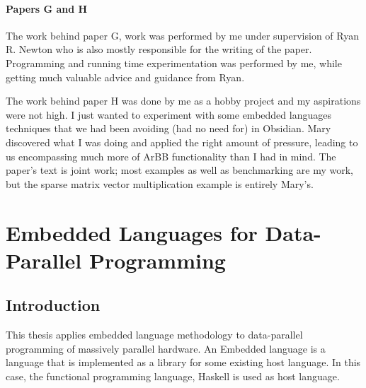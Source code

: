 \documentclass[a4paper]{book}
\newcommand{\thesistitle}{Embedded Languages for Data-Parallel Programming}
\begin{document}
\subsubsection{Papers G and H} 
The work behind paper G, work was performed by me 
under supervision of Ryan R. Newton who is also mostly responsible for the writing of the 
paper. Programming and running time experimentation was performed by me, while getting much 
valuable advice and guidance from Ryan. 

The work behind paper H was done by me as a hobby project and my aspirations were not 
high. I just wanted to experiment with some embedded languages techniques that we had 
been avoiding (had no need for) in Obsidian. Mary discovered what I was doing and applied 
the right amount of pressure, leading to us encompassing much more of ArBB functionality than 
I had in mind. The paper's text is joint work; most examples as well as benchmarking are my work,
but the sparse matrix vector multiplication example is entirely Mary's. 



\tableofcontents


\cleardoublepage
\clearpage

\pagestyle{fancy}
\fancyfoot{}
\fancyhead[LO]{}
\fancyhead[RO]{\leftmark}
\renewcommand{\headrulewidth}{0.0pt}
\fancyhead[LE,RO]{\thepage}

%
%
\chapter{\thesistitle}

\section{Introduction} 

This thesis applies embedded language methodology to data-parallel programming of 
massively parallel hardware. An Embedded language is a language that is implemented 
as a library for some existing host language. In this case, the functional programming 
language, Haskell is used as host language. 
\end{document}
